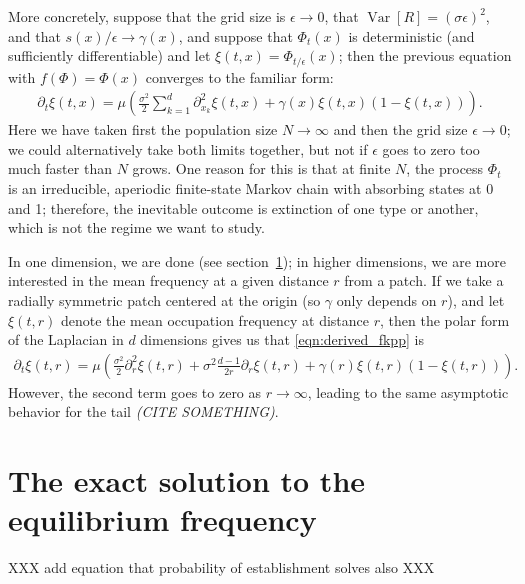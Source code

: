\documentclass{article}
\DeclareMathOperator{\var}{Var}
\newcommand{\plr}[1]{{\it\color{blue}(#1)}}
\begin{document}
More concretely, suppose that the grid size is $\epsilon \to 0$, 
that $\var[R] = (\sigma \epsilon)^2$, and that $s(x)/\epsilon \to \gamma(x)$,
and suppose that $\Phi_t(x)$ is deterministic (and sufficiently differentiable) and let $\xi(t,x) = \Phi_{t/\epsilon}(x)$;
then the previous equation with $f(\Phi) = \Phi(x)$ converges to the familiar form:
\begin{align}
  \label{eqn:derived_fkpp}
  \partial_t \xi(t,x) = \mu \left( \frac{\sigma^2}{2} \sum_{k=1}^d \partial_{x_k}^2 \xi(t,x) + \gamma(x) \xi(t,x) (1-\xi(t,x)) \right) .
\end{align}
Here we have taken first the population size $N \to \infty$ and then the grid size $\epsilon \to 0$;
we could alternatively take both limits together, but not if $\epsilon$ goes to zero too much faster than $N$ grows.
One reason for this is that at finite $N$,
the process $\Phi_t$ is an irreducible, aperiodic finite-state Markov chain with absorbing states at 0 and 1;
therefore, the inevitable outcome is extinction of one type or another,
which is not the regime we want to study.

In one dimension, we are done (see section~\ref{apx:elliptic_integrals});
in higher dimensions, we are more interested in the mean frequency at a given distance $r$ from a patch.
If we take a radially symmetric patch centered at the origin (so $\gamma$ only depends on $r$), 
and let $\xi(t,r)$ denote the mean occupation frequency at distance $r$,
then the polar form of the Laplacian in $d$ dimensions gives us that \eqref{eqn:derived_fkpp} is
\begin{align}
  \label{eqn:radial_fkpp}
  \partial_t \xi(t,r) = \mu \left( \frac{\sigma^2}{2} \partial_{r}^2 \xi(t,r) + \sigma^2\frac{d-1}{2r} \partial_r \xi(t,r) + \gamma(r) \xi(t,r) (1-\xi(t,r)) \right) .
\end{align}
However, the second term goes to zero as $r \to \infty$,
leading to the same asymptotic behavior for the tail \plr{CITE SOMETHING}.


\section{The exact solution to the equilibrium frequency}
\label{apx:elliptic_integrals}

XXX add equation that probability of establishment solves also XXX
\end{document}
